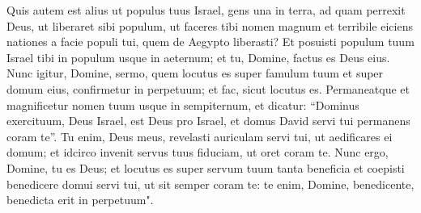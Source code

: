 \begin{biblechapter}
\verse Quis autem est alius ut populus tuus Israel, gens una in terra, ad quam perrexit Deus, ut liberaret sibi populum, ut faceres tibi nomen magnum et terribile eiciens nationes a facie populi tui, quem de Aegypto liberasti? 
\verse Et posuisti populum tuum Israel tibi in populum usque in aeternum; et tu, Domine, factus es Deus eius. 
\verse Nunc igitur, Domine, sermo, quem locutus es super famulum tuum et super domum eius, confirmetur in perpetuum; et fac, sicut locutus es. 
\verse Permaneatque et magnificetur nomen tuum usque in sempiternum, et dicatur: “Dominus exercituum, Deus Israel, est Deus pro Israel, et domus David servi tui permanens coram te”. 
\verse Tu enim, Deus meus, revelasti auriculam servi tui, ut aedificares ei domum; et idcirco invenit servus tuus fiduciam, ut oret coram te. 
\verse Nunc ergo, Domine, tu es Deus; et locutus es super servum tuum tanta beneficia 
\verse et coepisti benedicere domui servi tui, ut sit semper coram te: te enim, Domine, benedicente, benedicta erit in perpetuum". 
\end{biblechapter}

